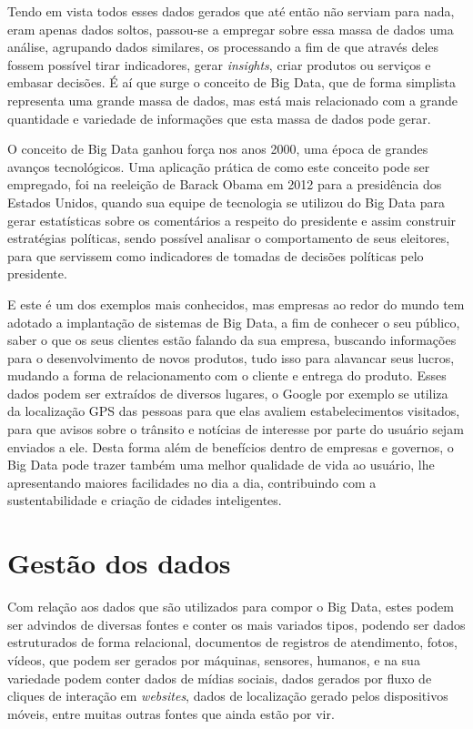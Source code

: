 Tendo em vista todos esses dados gerados que até então não serviam para nada, eram apenas dados soltos, passou-se a empregar sobre essa massa de dados uma análise, agrupando dados similares, os processando a fim de que através deles fossem possível tirar indicadores, gerar \textit{insights}, criar produtos ou serviços e embasar decisões. É aí que surge o conceito de Big Data, que de forma simplista representa uma grande massa de dados, mas está mais relacionado com a grande quantidade e variedade de informações que esta massa de dados pode gerar.~\cite{navegg}

O conceito de Big Data ganhou força nos anos 2000, uma época de grandes avanços tecnológicos. Uma aplicação prática de como este conceito pode ser empregado, foi na reeleição de Barack Obama em 2012 para a presidência dos Estados Unidos, quando sua equipe de tecnologia se utilizou do Big Data para gerar estatísticas sobre os comentários a respeito do presidente e assim construir estratégias políticas, sendo possível analisar o comportamento de seus eleitores, para que servissem como indicadores de tomadas de decisões políticas pelo presidente.~\cite{sinha2014making}

E este é um dos exemplos mais conhecidos, mas empresas ao redor do mundo tem adotado a implantação de sistemas de Big Data, a fim de conhecer o seu público, saber o que os seus clientes estão falando da sua empresa, buscando informações para o desenvolvimento de novos produtos, tudo isso para alavancar seus lucros, mudando a forma de relacionamento com o cliente e entrega do produto. Esses dados podem ser extraídos de diversos lugares, o Google por exemplo se utiliza da localização GPS das pessoas para que elas avaliem estabelecimentos visitados, para que avisos sobre o trânsito e notícias de interesse por parte do usuário sejam enviados a ele. Desta forma além de benefícios dentro de empresas e governos, o Big Data pode trazer também uma melhor qualidade de vida ao usuário, lhe apresentando maiores facilidades no dia a dia, contribuindo com a sustentabilidade e criação de cidades inteligentes.~\cite{navegg}

\section{Gestão dos dados}
\label{sec:gestaodados}
Com relação aos dados que são utilizados para compor o Big Data, estes podem ser advindos de diversas fontes e conter os mais variados tipos, podendo ser dados estruturados de forma relacional, documentos de registros de atendimento, fotos, vídeos, que podem ser gerados por máquinas, sensores, humanos, e na sua variedade podem conter dados de mídias sociais, dados gerados por fluxo de cliques de interação em \textit{websites}, dados de localização gerado pelos dispositivos móveis, entre muitas outras fontes que ainda estão por vir.~\cite{leigos}

